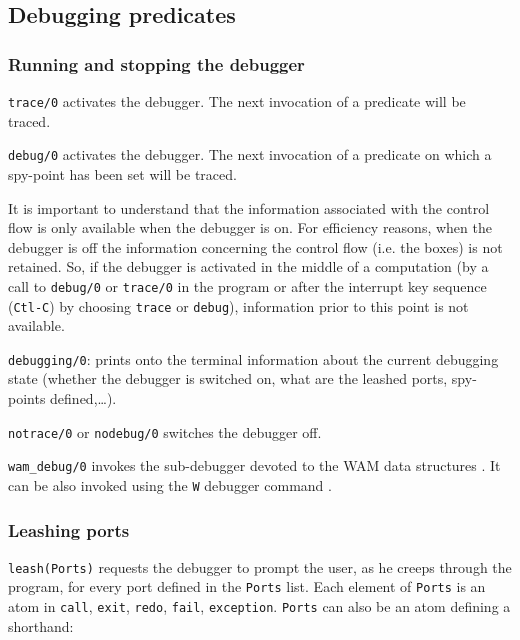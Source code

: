 \subsection{Debugging predicates}

\subsubsection{Running and stopping the debugger}
\label{Running-and-stopping-the-debugger}

\texttt{trace/0} activates the debugger. The next invocation of a predicate
will be traced.

\texttt{debug/0} activates the debugger. The next invocation of a predicate
on which a spy-point has been set will be traced.

It is important to understand that the information associated with the control
flow is only available when the debugger is on. For efficiency reasons, when
the debugger is off the information concerning the control flow (i.e. the
boxes) is not retained. So, if the debugger is activated in the middle of a
computation (by a call to \texttt{debug/0} or \texttt{trace/0} in the
program or after the interrupt key sequence (\texttt{Ctl-C}) by choosing
\texttt{trace} or \texttt{debug}), information prior to this point is not
available.

\texttt{debugging/0}: prints onto the terminal information about the current
debugging state (whether the debugger is switched on, what are the leashed
ports, spy-points defined,\ldots).

\texttt{notrace/0} or \texttt{nodebug/0} switches the debugger off.

\texttt{wam\_debug/0} invokes the sub-debugger devoted to the WAM data
structures . It can be also invoked using the
\texttt{W} debugger command .

\subsubsection{Leashing ports}
\label{Leashing-ports}

\texttt{leash(Ports)} requests the debugger to prompt the user, as
he creeps through the program, for every port defined in the \texttt{Ports}
list. Each element of \texttt{Ports} is an atom in \texttt{call},
\texttt{exit}, \texttt{redo}, \texttt{fail}, \texttt{exception}.
\texttt{Ports} can also be an atom defining a shorthand:

